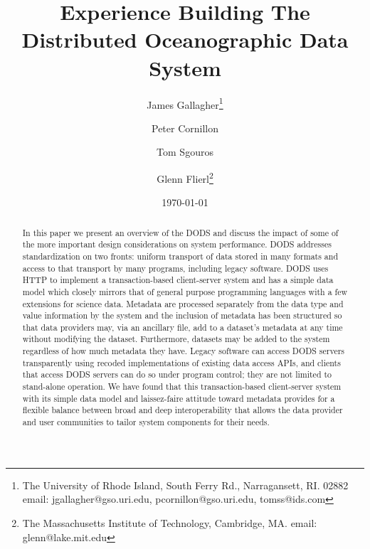 \documentclass[12pt]{article}
\begin{document}
\title{Experience Building The Distributed Oceanographic Data System}

\author{James Gallagher\footnote{The University of Rhode Island, South Ferry
    Rd., Narragansett, RI. 02882 email: jgallagher@gso.uri.edu,
    pcornillon@gso.uri.edu, tomss@ids.com} 
  \and Peter Cornillon\footnotemark[1]
  \and Tom Sgouros\footnotemark[1]
  \and Glenn Flierl\footnote{The Massachusetts Institute of Technology,
    Cambridge, MA. email: glenn@lake.mit.edu}}

\date{\today}

\maketitle

\begin{abstract}
  
  In this paper we present an overview of the \ac{DODS} and discuss the
  impact of some of the more important design considerations on system
  performance. \ac{DODS} addresses standardization on two fronts: uniform
  transport of data stored in many formats and access to that transport by
  many programs, including legacy software. \ac{DODS} uses \acs{HTTP} to
  implement a transaction-based client-server system and has a simple data
  model which closely mirrors that of general purpose programming languages
  with a few extensions for science data. Metadata are processed separately
  from the data type and value information by the system and the inclusion of
  metadata has been structured so that data providers may, via an ancillary
  file, add to a dataset's metadata at any time without modifying the
  dataset.  Furthermore, datasets may be added to the system regardless of
  how much metadata they have. Legacy software can access \ac{DODS} servers
  transparently using recoded implementations of existing data access
  \acs{API}s, and clients that access \ac{DODS} servers can do so under
  program control; they are not limited to stand-alone operation. We have
  found that this transaction-based client-server system with its simple data
  model and laissez-faire attitude toward metadata provides for a flexible
  balance between broad and deep interoperability that allows the
  data provider and user communities to tailor system components for their
  needs. 
 
\end{abstract}
\end{document}
